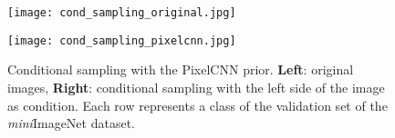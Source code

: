 \documentclass{article}
\theoremstyle{plain}
\theoremstyle{definition}
\theoremstyle{remark}
\begin{document}
\begin{figure}
    \centering
    \begin{minipage}[b]{0.45\textwidth}
        \texttt{[image: cond\_sampling\_original.jpg]}
    \end{minipage}
    \hfill
    \begin{minipage}[b]{0.45\textwidth}

    \texttt{[image: cond\_sampling\_pixelcnn.jpg]}
        \end{minipage}
    \caption{Conditional sampling with the PixelCNN prior. \textbf{Left}: original images, \textbf{Right}: conditional sampling with the left side of the image as condition. Each row represents a class of the validation set of the \textit{mini}ImageNet dataset.}
    \label{fig:miniimagenet_prior_pixelcnn_conditional}

\end{figure}


\clearpage



\end{document}
